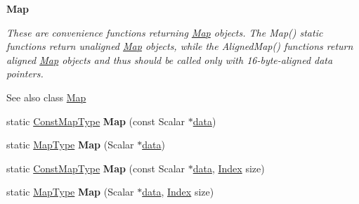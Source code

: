 \begin{Indent}\textbf{ Map}\par
{\em These are convenience functions returning \hyperlink{group___core___module_class_eigen_1_1_map}{Map} objects. The Map() static functions return unaligned \hyperlink{group___core___module_class_eigen_1_1_map}{Map} objects, while the Aligned\+Map() functions return aligned \hyperlink{group___core___module_class_eigen_1_1_map}{Map} objects and thus should be called only with 16-\/byte-\/aligned {\itshape data} pointers.

\begin{DoxySeeAlso}{See also}
class \hyperlink{group___core___module_class_eigen_1_1_map}{Map} 
\end{DoxySeeAlso}
}\begin{DoxyCompactItemize}
\item 
\mbox{\label{class_eigen_1_1_plain_object_base_aaf9fcc07dc13f89cf71d4a4e2b220d24}} 
static \hyperlink{group___core___module_class_eigen_1_1_map}{Const\+Map\+Type} {\bfseries Map} (const Scalar $\ast$\hyperlink{class_eigen_1_1_plain_object_base_ac25699535374b1854cf8494e44ad31b2}{data})
\item 
\mbox{\label{class_eigen_1_1_plain_object_base_ab5392255cbc16c3d3d91b09088e027b4}} 
static \hyperlink{group___core___module_class_eigen_1_1_map}{Map\+Type} {\bfseries Map} (Scalar $\ast$\hyperlink{class_eigen_1_1_plain_object_base_ac25699535374b1854cf8494e44ad31b2}{data})
\item 
\mbox{\label{class_eigen_1_1_plain_object_base_abd3e2e293d1d8591a5e6772ecc4d2c4c}} 
static \hyperlink{group___core___module_class_eigen_1_1_map}{Const\+Map\+Type} {\bfseries Map} (const Scalar $\ast$\hyperlink{class_eigen_1_1_plain_object_base_ac25699535374b1854cf8494e44ad31b2}{data}, \hyperlink{namespace_eigen_a62e77e0933482dafde8fe197d9a2cfde}{Index} size)
\item 
\mbox{\label{class_eigen_1_1_plain_object_base_ab195765374a1d5dee35dff790346bd42}} 
static \hyperlink{group___core___module_class_eigen_1_1_map}{Map\+Type} {\bfseries Map} (Scalar $\ast$\hyperlink{class_eigen_1_1_plain_object_base_ac25699535374b1854cf8494e44ad31b2}{data}, \hyperlink{namespace_eigen_a62e77e0933482dafde8fe197d9a2cfde}{Index} size)

\end{DoxyCompactItemize}
\end{Indent}
